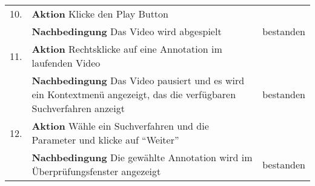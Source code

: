 \begin{enumerate} [label=\bfseries /TS \arabic*0/, leftmargin=*]
\begin{tabular}{@{}rp{4in}|l}
	\hline
	10. & \textbf{Aktion} Klicke den Play Button & \\
	    & \textbf{Nachbedingung} Das Video wird abgespielt & bestanden \\
	\hline
	11. & \textbf{Aktion} Rechtsklicke auf eine Annotation im laufenden Video & \\
	    & \textbf{Nachbedingung} Das Video pausiert und es wird ein Kontextmenü angezeigt, das die verfügbaren Suchverfahren anzeigt & bestanden \\
	\hline
	12. & \textbf{Aktion} Wähle ein Suchverfahren und die Parameter und klicke auf \enquote{Weiter} & \\
	    & \textbf{Nachbedingung} Die gewählte Annotation wird im Überprüfungsfenster angezeigt & bestanden \\
	\end{tabular}
	\newline



\end{enumerate}
